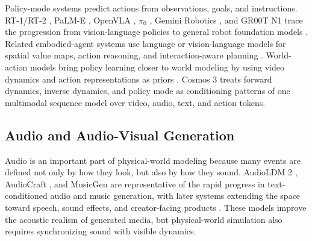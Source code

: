 \documentclass{llmxive}
\begin{document}
Policy-mode systems predict actions from observations, goals, and instructions.
RT-1/RT-2 \citep{brohan2022rt,brohan2023rt}, PaLM-E \citep{driess2023palme}, OpenVLA \citep{kim2024openvla}, $\pi_0$ \citep{black2024pi0}, Gemini Robotics \citep{gemini2025robotics,gemini_robotics15}, and GR00T N1 \citep{bjorck2025gr00t} trace the progression from vision-language policies to general robot foundation models \citep{roboflamingo,octo2024,pi05,liu2024rdt,zhou2025chatvla,zheng2026xvla,yang2025egovla,shi2025hi,lee2025molmoact,gr1,gr2}.
Related embodied-agent systems use language or vision-language models for spatial value maps, action reasoning, and interaction-aware planning \citep{voxposer,zawalski2024ecot,yang2025magma}.
World-action models bring policy learning closer to world modeling by using video dynamics and action representations as priors \citep{li2025uva,ye2026dreamzero,univla,rynnvla,world_action_survey,acwmphys}.
Cosmos 3 treats forward dynamics, inverse dynamics, and policy mode as conditioning patterns of one multimodal sequence model over video, audio, text, and action tokens.

\subsection{Audio and Audio-Visual Generation}
Audio is an important part of physical-world modeling because many events are defined not only by how they look, but also by how they sound.
AudioLDM 2 \citep{audioldm2}, AudioCraft \citep{audiocraft}, and MusicGen \citep{musicgen} are representative of the rapid progress in text-conditioned audio and music generation, with later systems extending the space toward speech, sound effects, and creator-facing products \citep{voicebox,audiobox,stableaudioopen,lee2024etta,suno,udio,elevenlabs_sfx}.
These models improve the acoustic realism of generated media, but physical-world simulation also requires synchronizing sound with visible dynamics.
\end{document}
